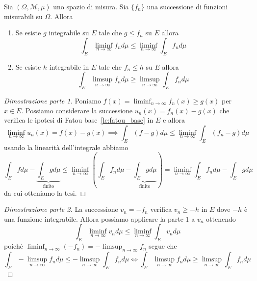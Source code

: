 \begin{lemma}\label{th:fatou_esteso}
    Sia \((\Omega, \mathcal{M}, \mu)\) uno spazio di misura. Sia \(\{f_{n}\}\) una
    successione di funzioni misurabili su \(\Omega\). Allora
\begin{enumerate}[label = \arabic*.]
    \item Se esiste \(g\) integrabile su \(E\) tale che \(g \le f_{n}\) su \(E\)
        allora
        \[
        \int_E \liminf_{n \to \infty} f_{n} d\mu \le \liminf_{n \to \infty} 
        \int_E f_{n} d\mu
        \]
    \item Se esiste \(h\) integrabile in \(E\) tale che \(f_{n} \le h\) su \(E\)
        allora
        \[
            \int_E \limsup_{n \to \infty} f_{n} d\mu \ge \limsup_{n \to \infty}
            \int_E f_{n} d\mu
        \]
\end{enumerate}
\end{lemma}
\begin{proof}[Dimostrazione parte 1]
    Poniamo \(f{(x)} = \liminf_{n \to \infty} f_{n}{(x)} \ge g{(x)}\) per \(x
    \in E\). Possiamo considerare la successione \(u_{n}{(x)} = f_{n}{(x)} -
    g{(x)}\) che verifica le ipotesi di Fatou base~\ref{le:fatou_base} in \(E\)
    e allora 
    \[
        \liminf_{n \to \infty} u_{n}{(x)} = f{(x)} - g{(x)}
        \implies 
        \int_E {\left( f-g \right)} d\mu \le \liminf_{n \to \infty} \int_E
        {\left( f_{n} - g \right)} d\mu
    \]
    usando la linearità dell'integrale abbiamo
    \[
        \int_E f d\mu - \underbrace{\int_E g d\mu}_{\text{finito}}  \le 
        \liminf_{n \to \infty} \left(\int_E f_{n}
        d\mu - \underbrace{\int_E g d\mu}_{\text{finito}} \right) = 
        \liminf_{n \to \infty} \int_E f_{n} d\mu - \int_E g d\mu
    \]
    da cui otteniamo la tesi.
\end{proof}
\begin{proof}[Dimostrazione parte 2]
    La successione \(v_{n} = -f_{n}\) verifica \(v_{n} \ge -h\) in \(E\) dove
    \(-h\) è una funzione integrabile. Allora possiamo applicare la parte 1 a
    \(v_{n}\) ottenendo 
    \[
        \int_E \liminf_{n \to \infty} v_{n} d\mu \le \liminf_{n \to \infty}
        \int_E v_{n} d\mu
    \]
    poiché \(\liminf_{n \to \infty} (-f_{n}) = -\limsup_{n \to \infty} f_{n}\)
    segue che
    \[
        \int_E -\limsup_{n \to \infty} f_{n} d\mu \le -\limsup_{n \to \infty}
        \int_E f_{n} d\mu \iff \int_E \limsup_{n \to \infty} f_{n} d\mu \ge 
        \limsup_{n \to \infty} \int_E f_{n} d\mu
    \]
\end{proof}


